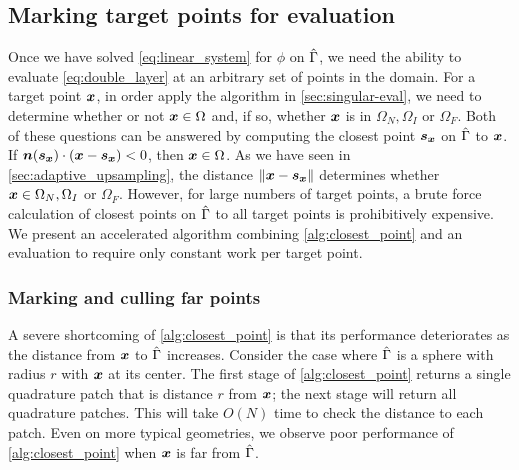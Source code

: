 \subsection{Marking target points for evaluation\label{app:point_marking}}

Once we have solved \cref{eq:linear_system} for $\phi$ on $\hat{\Gamma}$, we need the ability to evaluate \cref{eq:double_layer} at an arbitrary set of points in the domain.
For a target point ${\bm{x}}$, in order apply the algorithm in \cref{sec:singular-eval}, we need to determine whether or not ${\bm{x}} \in \Omega$ and, if so, whether ${\bm{x}} $ is in $\Omega_N, \Omega_I$ or $\Omega_F$.
Both of these questions can be answered by computing the closest point ${\bm{s}_{\bm{x}}}$ on $\hat{\Gamma}$ to ${\bm{x}}$. %
If ${\bm{n}}({\bm{s}_{\bm{x}}})\cdot({\bm{x}} - {\bm{s}_{\bm{x}}}) < 0$, then ${\bm{x}} \in \Omega$. 
As we have seen in \cref{sec:adaptive_upsampling}, the distance $\|{\bm{x}} - {\bm{s}_{\bm{x}}}\|$ determines whether ${\bm{x}} \in \Omega_N,\Omega_I$ or $\Omega_F$.
However, for large numbers of target points, a brute force calculation of closest points on $\hat{\Gamma}$ to all target points is prohibitively expensive.
We present an accelerated algorithm combining \cref{alg:closest_point} and an \fmm evaluation to require only constant work per target point. 


\subsubsection{Marking and culling far points \label{sec:mark_far}}
A severe shortcoming of \cref{alg:closest_point} is that its performance deteriorates as the distance from ${\bm{x}}$ to $\hat{\Gamma}$ increases. 
Consider the case where $\hat{\Gamma}$ is a sphere with radius $r$ with ${\bm{x}}$ at its center.
The first stage of \cref{alg:closest_point} returns a single quadrature patch that is distance $r$ from ${\bm{x}}$; the next stage will return all quadrature patches.
This will take $O(N)$ time to check the distance to each patch.
Even on more typical geometries, we observe poor performance of \cref{alg:closest_point} when ${\bm{x}}$ is far from $\hat{\Gamma}$.

